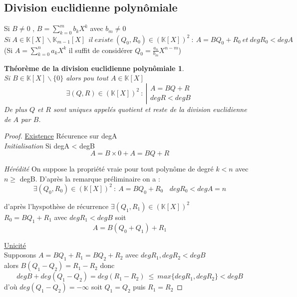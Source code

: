		\subsection{Division euclidienne polynômiale}
			Si $B \neq 0$ , $B = \sum\limits_{k=0}^m b_k X^k$ avec $b_m\neq 0$ \vspace*{10pt}\\
			\[Si~ A\in\mathbb{K} [X] \backslash \mathbb{K}_{m-1} [X] ~~il~existe~(Q_0,R_0)
			\in (\mathbb{K} [X])^2~:~A=BQ_0+R_0 ~et~degR_0 < degA\]
			(Si $A=\sum\limits_{k=0}^{n} a_{k} X^{k}$ il suffit de considérer 
			$Q_0 =\frac{a_n}{b_m} X^{n-m}$)
			\newtheorem*{th10}{Théorème de la division euclidienne polynômiale}
			\begin{th10}\label{Th DEucl Pol} 
				${}$\\Si $B\in \mathbb{K} [X] \backslash \{0\}$ alors pou tout 
				$A\in\mathbb{K} [X]$
				\[\exists (Q,R) \in (\mathbb{K} [X])^2 ~:~ \left|\begin{array}{l}
				A=BQ+R\\ degR < deg B
				\end{array}\right. \] 
			De plus $Q$ et $R$ sont uniques appelés quotient et reste de la division 
			euclidienne de $A$ par $B$.
			\end{th10}
			\begin{proof}
				\underline{Existence} \medskip Récurence sur degA \\
				\hspace*{20pt} \textit{Initialisation} \hspace{20pt} Si degA < degB
				\[A=B\times 0 + A = BQ + R \]
	
				\hspace{20pt} \textit{Hérédité} \hspace{20pt} On suppose la propriété vraie 
				pour tout polynôme de degré $k<n$ avec $n\geq$ degB. 
				D'après la remarque préliminaire on a :
				\[\exists (Q_0,R_0) \in (\mathbb{K} [X])^2 ~:~A=BQ_0 +R_0 ~~~~ degR_0<degA=n\]
				\begin{center} d'après l'hyspothèse de récurrence $\exists (Q_1,R_1) 
				\in (\mathbb{K} [X])^2$ \\
				\hspace*{10pt} $R_0 =BQ_1+R_1$ avec $degR_1<degB$ soit 
				\[A=B(Q_0 + Q_1) + R_1\] \end{center}
				\hspace*{40pt} \underline{Unicité} \\
				\hspace*{20pt} Supposons $A=BQ_1 +R_1 = BQ_2 +R_2$ avec $degR_1,degR_2<degB$\\
				alors $B(Q_1 - Q_2) = R_1 - R_2$ donc
				\[degB + deg(Q_1 -Q_2) = deg(R_1 - R_2)~\leq~max\{degR_1,degR_2\} < degB\]
				d'où $deg(Q_1 -Q_2) = -\infty$ soit $Q_1=Q_2$ puis $R_1=R_2$
			\end{proof}

